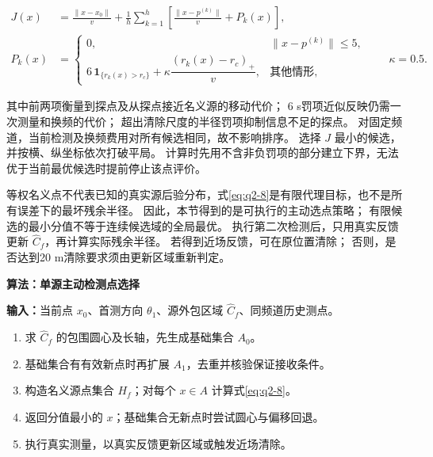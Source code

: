 \documentclass[UTF8,a4paper,zihao=5,fontset=fandol]{ctexart}
\newcounter{algorithm}
\renewcommand{\thealgorithm}{\arabic{algorithm}}
\begin{document}
\begin{equation}\label{eq:q2-8}
\begin{aligned}
J(x)&=\frac{\|x-x_0\|}{v}
+\frac1h\sum_{k=1}^{h}\left[\frac{\|x-p^{(k)}\|}{v}+P_k(x)\right],\\
P_k(x)&=\begin{cases}
0,&\|x-p^{(k)}\|\le5,\\
6\,\mathbf1_{\{r_k(x)>r_c\}}
+\kappa\dfrac{(r_k(x)-r_c)_+}{v},&\text{其他情形},
\end{cases}\qquad\kappa=0.5.
\end{aligned}
\end{equation}

其中前两项衡量到探点及从探点接近名义源的移动代价；
6 s罚项近似反映仍需一次测量和换频的代价；
超出清除尺度的半径罚项抑制信息不足的探点。
对固定频道，当前检测及换频费用对所有候选相同，故不影响排序。
选择 \(J\) 最小的候选，并按横、纵坐标依次打破平局。
计算时先用不含非负罚项的部分建立下界，无法优于当前最优候选时提前停止该点评价。

等权名义点不代表已知的真实源后验分布，式\eqref{eq:q2-8}是有限代理目标，也不是所有误差下的最坏残余半径。
因此，本节得到的是可执行的主动选点策略；
有限候选的最小分值不等于连续候选域的全局最优。
执行第二次检测后，只用真实反馈更新 \(\widehat C_f\)，再计算实际残余半径。
若得到近场反馈，可在原位置清除；
否则，是否达到20 m清除要求须由更新区域重新判定。

\par\noindent\begin{minipage}{\linewidth}
\label{alg:q2-probe}
\textbf{算法\thealgorithm：单源主动检测点选择}

\small
\textbf{输入：}当前点 \(x_0\)、首测方向 \(\theta_1\)、源外包区域
\(\widehat C_f\)、同频道历史测点。
\begin{enumerate}[label=\arabic*.,ref=\arabic*,leftmargin=2em,itemsep=2pt,topsep=4pt]
  \item 求 \(\widehat C_f\) 的包围圆心及长轴，先生成基础集合 \(A_0\)。
  \item 基础集合有有效新点时再扩展 \(A_1\)，去重并核验保证接收条件。
  \item 构造名义源点集合 \(H_f\)；对每个 \(x\in A\) 计算式\eqref{eq:q2-8}。
  \item 返回分值最小的 \(x\)；基础集合无新点时尝试圆心与偏移回退。
  \item 执行真实测量，以真实反馈更新区域或触发近场清除。
\end{enumerate}
\end{minipage}\par
\end{document}
